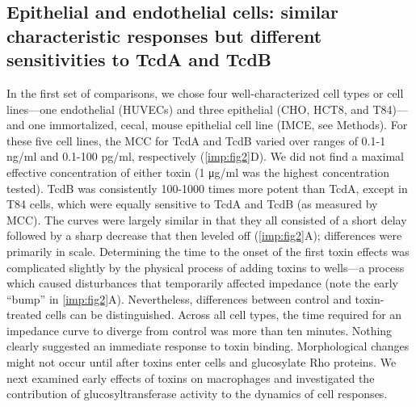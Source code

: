 \subsection{Epithelial and endothelial cells: similar characteristic responses
              but different sensitivities to TcdA and TcdB}
In the first set of comparisons, we chose four well-characterized 
cell types or cell lines—one endothelial (HUVECs) and three 
epithelial (CHO, HCT8, and T84)—and one immortalized, cecal, 
mouse epithelial cell line (IMCE, see Methods). For these 
five cell lines, the MCC for TcdA and TcdB varied over ranges 
of 0.1-1 ng/ml and 0.1-100 pg/ml, respectively (\autoref{imp:fig2}D). 
We did not find a maximal effective concentration of either 
toxin (1 μg/ml was the highest concentration tested). TcdB 
was consistently 100-1000 times more potent than TcdA, except 
in T84 cells, which were equally sensitive to TcdA and 
TcdB (as measured by MCC). The curves were largely similar 
in that they all consisted of a short delay followed by a 
sharp decrease that then leveled off (\autoref{imp:fig2}A); differences 
were primarily in scale. Determining the time to the onset 
of the first toxin effects was complicated slightly by the 
physical process of adding toxins to wells—a process which 
caused disturbances that temporarily affected impedance 
(note the early ``bump'' in \autoref{imp:fig2}A). Nevertheless, differences 
between control and toxin-treated cells can be distinguished. 
Across all cell types, the time required for an impedance 
curve to diverge from control was more than ten minutes. 
Nothing clearly suggested an immediate response to toxin binding. 
Morphological changes might not occur until after toxins 
enter cells and glucosylate Rho proteins. We next examined 
early effects of toxins on macrophages and investigated the 
contribution of glucosyltransferase activity to the dynamics 
of cell responses.


